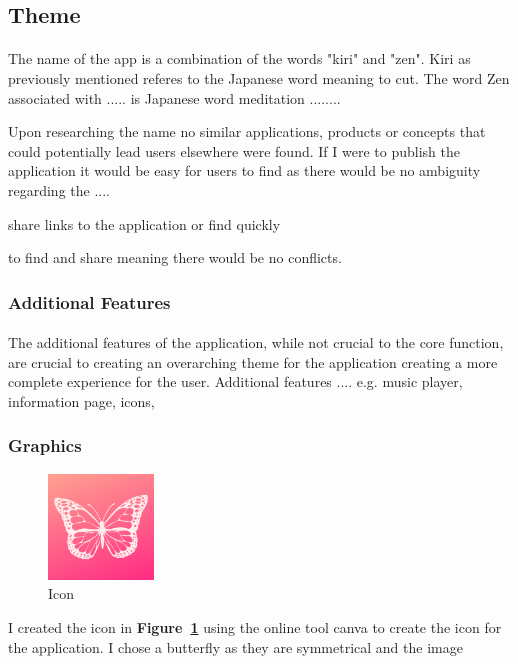 \documentclass[11pt]{article}
\begin{document}
    
    \subsection{Theme}
        
        \paragraph{}
        The name of the app is a combination of the words "kiri" and "zen". Kiri as previously mentioned referes to the Japanese word meaning to cut. The word Zen  associated with ..... is Japanese word meditation ........ 
        
        Upon researching the name no similar applications, products or concepts that could potentially lead users elsewhere were found. If I were to publish the application it would be easy for users to find as there would be no ambiguity regarding the ....
        
        
        share links to the application or find quickly 
        
        to find and share meaning there would be no conflicts.

        \subsubsection{Additional Features}
        \paragraph{}
        The additional features of the application, while not crucial to the core function, are crucial to creating an overarching theme for the application creating a more complete experience for the user.    Additional features .... e.g. music player, information page, icons, 
        
         \subsubsection{Graphics}
    
        \begin{figure}
                        \centering
                        \includegraphics[width=0.25\textwidth]{KiriZen/icon.png}
                        \caption{Icon}
                        \label{fig:icon}
                    \end{figure}
            I created the icon in \textbf{Figure~\ref{fig:icon}} using the online tool canva %
            to create the icon for the application. I chose a butterfly as they are symmetrical and the image
            
\end{document}
